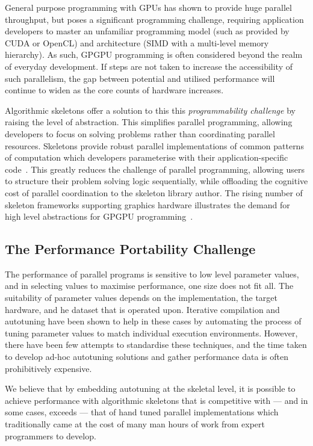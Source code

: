 \documentclass[nonatbib,preprint,9pt]{sigplanconf}
\begin{document}
General purpose programming with GPUs has shown to provide huge
parallel throughput, but poses a significant programming challenge,
requiring application developers to master an unfamiliar programming
model (such as provided by CUDA or OpenCL) and architecture (SIMD with
a multi-level memory hierarchy). As such, GPGPU programming is often
considered beyond the realm of everyday development. If steps are not
taken to increase the accessibility of such parallelism, the gap
between potential and utilised performance will continue to widen as
the core counts of hardware increases.

Algorithmic skeletons offer a solution to this this
\emph{programmability challenge} by raising the level of
abstraction. This simplifies parallel programming, allowing developers
to focus on solving problems rather than coordinating parallel
resources. Skeletons provide robust parallel implementations of common
patterns of computation which developers parameterise with their
application-specific code~\cite{Gonzalez2010}. This greatly reduces
the challenge of parallel programming, allowing users to structure
their problem solving logic sequentially, while offloading the
cognitive cost of parallel coordination to the skeleton library
author. The rising number of skeleton frameworks supporting graphics
hardware illustrates the demand for high level abstractions for GPGPU
programming~\cite{Enmyren2010, Marques2013, Nugteren2014a}.


\subsection{The Performance Portability Challenge}

The performance of parallel programs is sensitive to low level
parameter values, and in selecting values to maximise performance, one
size does not fit all. The suitability of parameter values depends on
the implementation, the target hardware, and he dataset that is
operated upon. Iterative compilation and autotuning have been shown to
help in these cases by automating the process of tuning parameter
values to match individual execution environments. However, there have
been few attempts to standardise these techniques, and the time taken
to develop ad-hoc autotuning solutions and gather performance data is
often prohibitively expensive.

We believe that by embedding autotuning at the skeletal level, it is
possible to achieve performance with algorithmic skeletons that is
competitive with --- and in some cases, exceeds --- that of hand tuned
parallel implementations which traditionally came at the cost of many
man hours of work from expert programmers to develop.
\end{document}
